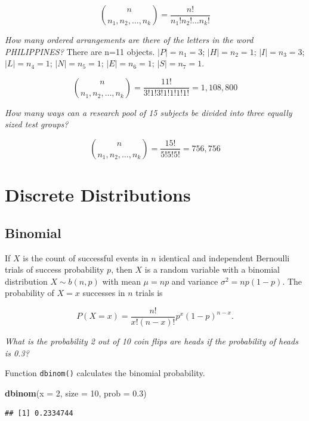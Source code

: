\documentclass[]{book}
\newenvironment{Shaded}{\begin{snugshade}}{\end{snugshade}}
\newcommand{\DataTypeTok}[1]{\textcolor[rgb]{0.13,0.29,0.53}{#1}}
\newcommand{\DecValTok}[1]{\textcolor[rgb]{0.00,0.00,0.81}{#1}}
\newcommand{\FloatTok}[1]{\textcolor[rgb]{0.00,0.00,0.81}{#1}}
\newcommand{\KeywordTok}[1]{\textcolor[rgb]{0.13,0.29,0.53}{\textbf{#1}}}
\newcommand{\NormalTok}[1]{#1}
\begin{document}
\[{n \choose {n_1, n_2, \dots, n_k}} = \frac{n!}{n_1! n_2! \dots n_k!}\]

\emph{How many ordered arrangements are there of the letters in the word PHILIPPINES?} There are n=11 objects. \(|P|=n_1=3\); \(|H|=n_2=1\); \(|I|=n_3=3\); \(|L|=n_4=1\); \(|N|=n_5=1\); \(|E|=n_6=1\); \(|S|=n_7=1\).

\[{n \choose {n_1, n_2, \dots, n_k}} = \frac{11!}{3! 1! 3! 1! 1! 1! 1!} = 1,108,800\]

\emph{How many ways can a research pool of 15 subjects be divided into three equally sized test groups?}

\[{n \choose {n_1, n_2, \dots, n_k}} = \frac{15!}{5! 5! 5!} = 756,756\]

\hypertarget{discrete-distributions}{%
\section{Discrete Distributions}\label{discrete-distributions}}

\hypertarget{binomial}{%
\subsection{Binomial}\label{binomial}}

If \(X\) is the count of successful events in \(n\) identical and independent Bernoulli trials of success probability \(p\), then \(X\) is a random variable with a binomial distribution \(X \sim b(n,p)\) with mean \(\mu=np\) and variance \(\sigma^2 = np(1-p)\). The probability of \(X=x\) successes in \(n\) trials is

\[P(X=x) = \frac{{n!}}{{x!(n-x)!}} p^x (1-p)^{n-x}.\]

\emph{What is the probability 2 out of 10 coin flips are heads if the probability of heads is 0.3?}

Function \texttt{dbinom()} calculates the binomial probability.

\begin{Shaded}
\begin{Highlighting}[]
\KeywordTok{dbinom}\NormalTok{(}\DataTypeTok{x =} \DecValTok{2}\NormalTok{, }\DataTypeTok{size =} \DecValTok{10}\NormalTok{, }\DataTypeTok{prob =} \FloatTok{0.3}\NormalTok{)}
\end{Highlighting}
\end{Shaded}

\begin{verbatim}
## [1] 0.2334744
\end{verbatim}
\end{document}

